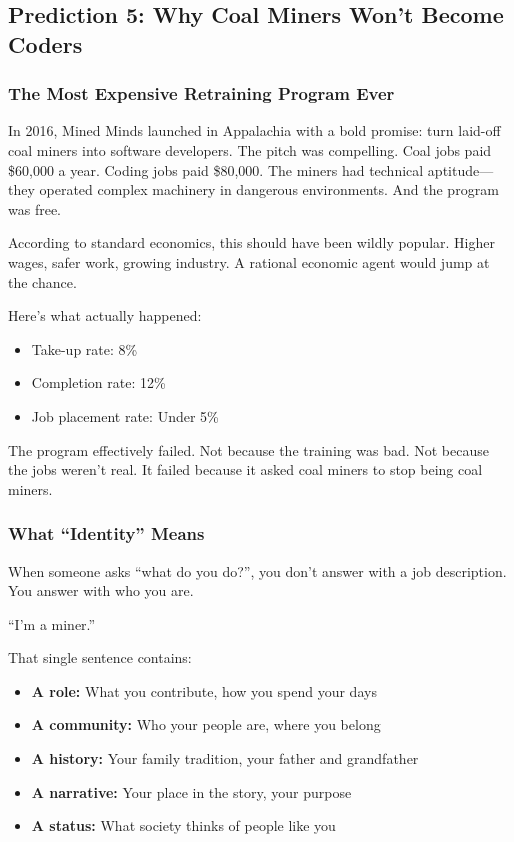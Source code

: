 \subsection{Prediction 5: Why Coal Miners Won't Become Coders}
\label{subsec:pred5-identity}


\subsubsection{The Most Expensive Retraining Program Ever}

In 2016, Mined Minds launched in Appalachia with a bold promise: turn 
laid-off coal miners into software developers. The pitch was compelling. 
Coal jobs paid \$60,000 a year. Coding jobs paid \$80,000. The miners 
had technical aptitude---they operated complex machinery in dangerous 
environments. And the program was free.

According to standard economics, this should have been wildly popular. 
Higher wages, safer work, growing industry. A rational economic agent 
would jump at the chance.

Here's what actually happened:

\begin{itemize}
    \item Take-up rate: 8\%
    \item Completion rate: 12\%
    \item Job placement rate: Under 5\%
\end{itemize}

The program effectively failed. Not because the training was bad. Not 
because the jobs weren't real. It failed because it asked coal miners 
to stop being coal miners.

\subsubsection{What ``Identity'' Means}

When someone asks ``what do you do?'', you don't answer with a job 
description. You answer with who you are.

``I'm a miner.''

That single sentence contains:
\begin{itemize}
    \item \textbf{A role:} What you contribute, how you spend your days
    \item \textbf{A community:} Who your people are, where you belong
    \item \textbf{A history:} Your family tradition, your father and grandfather
    \item \textbf{A narrative:} Your place in the story, your purpose
    \item \textbf{A status:} What society thinks of people like you
\end{itemize}

